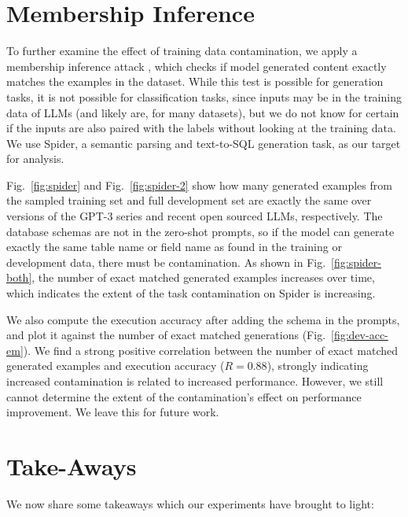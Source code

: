 \documentclass[letterpaper]{article} %
\newcommand{\jmf}[1]{}      %
\begin{document}
\section{Membership Inference}
\label{sec:membershipinference}
\jmf{This is not possible to do for classification tasks.  So we do it for a generation task.}


To further examine the effect of training data contamination, we apply a membership inference attack \cite{hu2022}, which checks if model generated content exactly matches the examples in the dataset. While this test is possible for generation tasks, it is not possible for classification tasks, since inputs may be in the training data of LLMs (and likely are, for many datasets), but we do not know for certain if the inputs are also paired with the labels without looking at the training data. We use Spider, a semantic parsing and text-to-SQL generation task, \cite{yu2018} as our target for analysis.

Fig.~\ref{fig:spider} and Fig.~\ref{fig:spider-2} show how many generated examples from the sampled training set and full development set are exactly the same over versions of the GPT-3 series and recent open sourced LLMs, respectively. The database schemas are not in the zero-shot prompts, so if the model can generate exactly the same table name or field name as found in the training or development data, there must be contamination. As shown in Fig.~\ref{fig:spider-both}, the number of exact matched generated examples increases over time, which indicates the extent of the task contamination on Spider is increasing. 

We also compute the execution accuracy after adding the schema in the prompts, and plot it against the number of exact matched generations (Fig.~\ref{fig:dev-acc-em}). We find a strong positive correlation between the number of exact matched generated examples and execution accuracy ($R = 0.88$), strongly indicating increased contamination is related to increased performance. However, we still cannot determine the extent of the contamination's effect on performance improvement. We leave this for future work. 



\section{Take-Aways}
We now share some takeaways which our experiments have brought to light:
\end{document}
